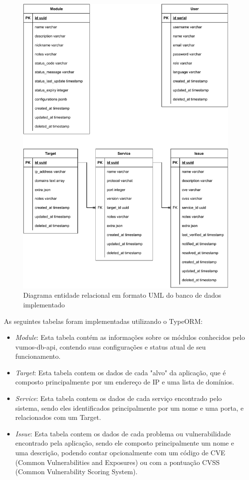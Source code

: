     \begin{figure}[H]
        \includegraphics[scale=0.7]{figuras/vumos-db-api-uml.pdf}
        \caption{Diagrama entidade relacional em formato UML do banco de dados implementado \label{fig:vumos-db-uml}}
    \end{figure}
    
    As seguintes tabelas foram implementadas utilizando o TypeORM:
    \begin{itemize}
        \item \emph{Module}: Esta tabela contém as informações sobre os módulos conhecidos pelo vumos-db-api, contendo suas configurações e status atual de seu funcionamento.
        \item \emph{Target}: Esta tabela contem os dados de cada "alvo" da aplicação, que é composto principalmente por um endereço de IP e uma lista de domínios.
        \item \emph{Service}: Esta tabela contem os dados de cada serviço encontrado pelo sistema, sendo eles identificados principalmente por um nome e uma porta, e relacionados com um Target.
        \item \emph{Issue}: Esta tabela contem os dados de cada problema ou vulnerabilidade encontrado pela aplicação, sendo ele composto principalmente um nome e uma descrição, podendo contar opcionalmente com um código de CVE (Common Vulnerabilities and Exposures) ou com a pontuação CVSS (Common Vulnerability Scoring System).
    \end{itemize}
    
